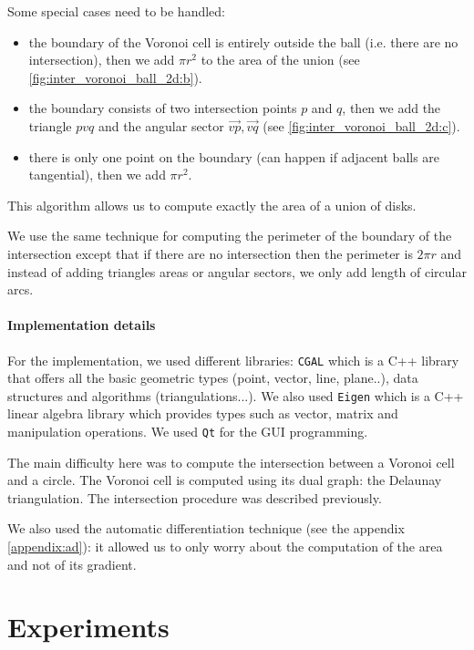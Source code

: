 Some special cases need to be handled:
\begin{itemize}
    \item the boundary of the Voronoi cell is entirely outside the ball (i.e.
        there are no intersection), then we add $ \pi r^2 $ to the area of the
        union (see \ref{fig:inter_voronoi_ball_2d:b}).
    \item the boundary consists of two intersection points $ p $ and $ q $, then
        we add the triangle $ pvq $ and the angular sector $ \vec{vp}, \vec{vq}
        $ (see \ref{fig:inter_voronoi_ball_2d:c}).
    \item there is only one point on the boundary (can happen if adjacent balls
        are tangential), then we add $ \pi r^2 $.
\end{itemize}

This algorithm allows us to compute exactly the area of a union of disks.

We use the same technique for computing the perimeter of the boundary of the
intersection except that if there are no intersection then the perimeter is $ 2
\pi r $ and instead of adding triangles areas or angular sectors, we only add
length of circular arcs.

\paragraph{Implementation details}

For the implementation, we used different libraries: \texttt{CGAL} which is a
C++ library that offers all the basic geometric types (point, vector, line,
plane..), data structures and algorithms (triangulations...). We also used
\texttt{Eigen} which is a C++ linear algebra library which provides types such
as vector, matrix and manipulation operations. We used \texttt{Qt} for the GUI
programming.

The main difficulty here was to compute the intersection between a Voronoi cell
and a circle. The Voronoi cell is computed using its dual graph: the Delaunay
triangulation. The intersection procedure was described previously.

We also used the automatic differentiation technique (see the appendix
\ref{appendix:ad}): it allowed us to only worry about the computation of the
area and not of its gradient.

\section{Experiments}

